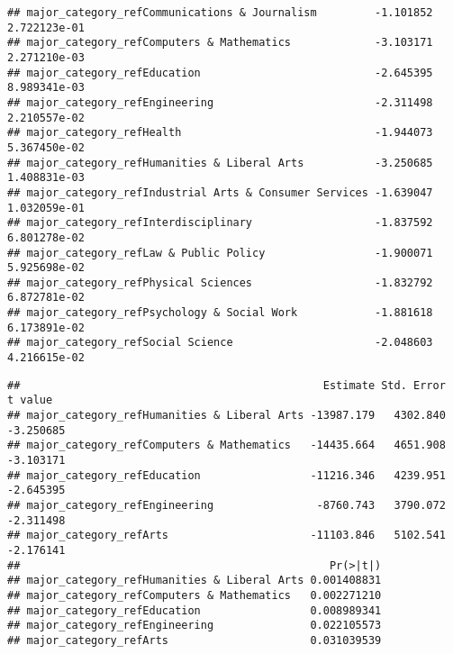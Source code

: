 \documentclass[
]{article}
\newenvironment{Shaded}{\begin{snugshade}}{\end{snugshade}}
\newcommand{\DecValTok}[1]{\textcolor[rgb]{0.00,0.00,0.81}{#1}}
\newcommand{\FunctionTok}[1]{\textcolor[rgb]{0.00,0.00,0.00}{#1}}
\newcommand{\NormalTok}[1]{#1}
\newcommand{\OtherTok}[1]{\textcolor[rgb]{0.56,0.35,0.01}{#1}}
\newcommand{\SpecialCharTok}[1]{\textcolor[rgb]{0.00,0.00,0.00}{#1}}
\begin{document}
\begin{verbatim}
## major_category_refCommunications & Journalism         -1.101852 2.722123e-01
## major_category_refComputers & Mathematics             -3.103171 2.271210e-03
## major_category_refEducation                           -2.645395 8.989341e-03
## major_category_refEngineering                         -2.311498 2.210557e-02
## major_category_refHealth                              -1.944073 5.367450e-02
## major_category_refHumanities & Liberal Arts           -3.250685 1.408831e-03
## major_category_refIndustrial Arts & Consumer Services -1.639047 1.032059e-01
## major_category_refInterdisciplinary                   -1.837592 6.801278e-02
## major_category_refLaw & Public Policy                 -1.900071 5.925698e-02
## major_category_refPhysical Sciences                   -1.832792 6.872781e-02
## major_category_refPsychology & Social Work            -1.881618 6.173891e-02
## major_category_refSocial Science                      -2.048603 4.216615e-02
\end{verbatim}

\begin{Shaded}
\end{Shaded}

\begin{verbatim}
##                                               Estimate Std. Error   t value
## major_category_refHumanities & Liberal Arts -13987.179   4302.840 -3.250685
## major_category_refComputers & Mathematics   -14435.664   4651.908 -3.103171
## major_category_refEducation                 -11216.346   4239.951 -2.645395
## major_category_refEngineering                -8760.743   3790.072 -2.311498
## major_category_refArts                      -11103.846   5102.541 -2.176141
##                                                Pr(>|t|)
## major_category_refHumanities & Liberal Arts 0.001408831
## major_category_refComputers & Mathematics   0.002271210
## major_category_refEducation                 0.008989341
## major_category_refEngineering               0.022105573
## major_category_refArts                      0.031039539
\end{verbatim}
\end{document}

